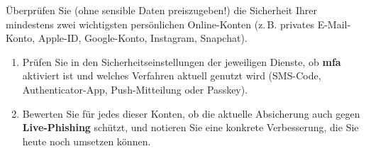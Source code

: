 \documentclass[12pt,a4paper]{article}
\begin{document}
\begin{taskbox}
Überprüfen Sie (ohne sensible Daten preiszugeben!) die Sicherheit Ihrer mindestens zwei wichtigsten persönlichen Online-Konten (z.\,B. privates E-Mail-Konto, Apple-ID, Google-Konto, Instagram, Snapchat).
\begin{enumerate}[label=\alph*)]
    \item Prüfen Sie in den Sicherheitseinstellungen der jeweiligen Dienste, ob \textbf{\gls{mfa}} aktiviert ist und welches Verfahren aktuell genutzt wird (SMS-Code, Authenticator-App, Push-Mitteilung oder Passkey).
    \item Bewerten Sie für jedes dieser Konten, ob die aktuelle Absicherung auch gegen \textbf{Live-Phishing} schützt, und notieren Sie eine konkrete Verbesserung, die Sie heute noch umsetzen können.
\end{enumerate}
\end{taskbox}

\newpage
\printbibliography[heading=bibintoc, title={Literaturverzeichnis}]

\vspace{1.5cm}
\printglossary[type=\acronymtype, title=Akronyme]

\newpage
\printglossary[title=Glossar]
\end{document}
